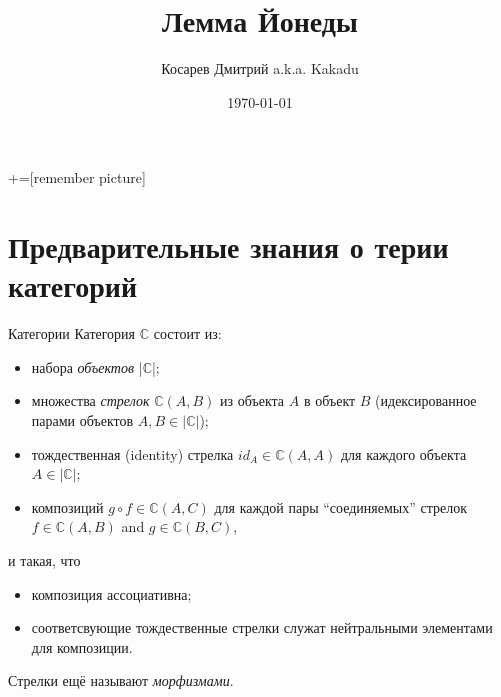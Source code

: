 \documentclass[
  russian,
  aspectratio=169,
  xcolor={svgnames},
  hyperref={colorlinks,citecolor=DeepPink4,linkcolor=DarkRed,urlcolor=DarkBlue}]{beamer}
\title{Лемма Йонеды}
\author[Косарев Дмитрий]{Косарев Дмитрий a.k.a. Kakadu}
\institute[]{матмех СПбГУ}
\date{\today}
\begin{document}
\maketitle

+=[remember picture]

\everymath{\displaystyle}


\section{Предварительные знания о терии категорий}

\begin{frame}[fragile]{Категории}
 Категория $\mathbb{C}$ состоит из:
\begin{itemize}
 \item набора \textit{объектов} |$\mathbb{C}$|;
 \item множества \textit{стрелок} $\mathbb{C}(A, B)$ из объекта $A$ в объект $B$ (идексированное парами объектов $A, B \in |\mathbb{C}|$);
 \item тождественная (identity) стрелка $id_A \in\mathbb{C}(A, A)$ для каждого объекта $A \in |\mathbb{C}|$;
 \item композиций $g\circ f \in\mathbb{C}(A, C)$ для каждой пары ``соединяемых'' стрелок $f \in\mathbb{C}(A, B)$ and $g \in\mathbb{C}(B, C)$,\\
\end{itemize}
и такая, что 
\begin{itemize}
 \item композиция ассоциативна;
 \item соответсвующие тождественные стрелки служат нейтральными элементами для композиции.
\end{itemize}
\vspace{0.5cm}
Стрелки ещё называют \textit{морфизмами}.
\end{frame}
\end{document}
